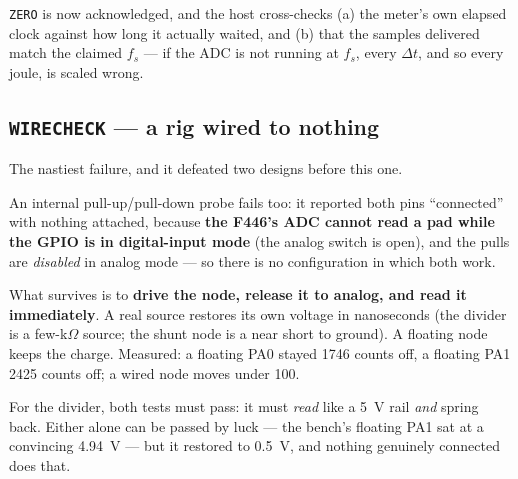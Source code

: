 \documentclass[11pt,a4paper]{article}
\begin{document}
\medskip
\noindent
{}

\medskip
\noindent
\texttt{ZERO} is now acknowledged, and the host cross-checks (a) the meter's own elapsed clock
against how long it actually waited, and (b) that the samples delivered match the claimed $f_s$
--- if the ADC is not running at $f_s$, every $\Delta t$, and so every joule, is scaled wrong.

\subsection{\texttt{WIRECHECK} --- a rig wired to nothing}

The nastiest failure, and it defeated two designs before this one.

\medskip
\noindent
{}

\medskip
\noindent
An internal pull-up/pull-down probe fails too: it reported both pins ``connected'' with nothing
attached, because \textbf{the F446's ADC cannot read a pad while the GPIO is in digital-input
mode} (the analog switch is open), and the pulls are \emph{disabled} in analog mode --- so there
is no configuration in which both work.

\medskip
\noindent
What survives is to \textbf{drive the node, release it to analog, and read it immediately}. A real
source restores its own voltage in nanoseconds (the divider is a few-k$\Omega$ source; the shunt
node is a near short to ground). A floating node keeps the charge. Measured: a floating PA0 stayed
\num{1746} counts off, a floating PA1 \num{2425} counts off; a wired node moves under \num{100}.

\medskip
\noindent
For the divider, both tests must pass: it must \emph{read} like a \SI{5}{\volt} rail \emph{and}
spring back. Either alone can be passed by luck --- the bench's floating PA1 sat at a convincing
\SI{4.94}{\volt} --- but it restored to \SI{0.5}{\volt}, and nothing genuinely connected does that.
\end{document}
